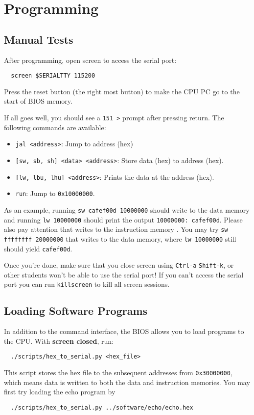 \section{Programming} \label{sec:programming}
\subsection{Manual Tests}
After programming, open screen to access the serial port:
\begin{verbatim}
  screen $SERIALTTY 115200
\end{verbatim}
Press the reset button (the right most button) to make the CPU PC go to the start of BIOS memory.

If all goes well, you should see a \verb|151 >| prompt after pressing return.
The following commands are available:
\begin{itemize}
\item \verb|jal <address>|: Jump to address (hex)
\item \verb|[sw, sb, sh] <data> <address>|: Store data (hex) to address (hex).
\item \verb|[lw, lbu, lhu] <address>|: Prints the data at the address (hex).
\item \verb|run|: Jump to \verb|0x10000000|.
\end{itemize}

As an example, running \verb|sw cafef00d 10000000| should write to the data memory
and running \verb|lw 10000000| should print the output \verb|10000000: cafef00d|.
Please also pay attention that writes to the instruction memory .
You may try \verb|sw ffffffff 20000000| that writes to the data memory,
where \verb|lw 10000000| still should yield \verb|cafef00d|.

Once you're done, make sure that you close screen using \verb|Ctrl-a| \verb|Shift-k|,
or other students won't be able to use the serial port!
If you can't access the serial port you can run \verb|killscreen| to kill all screen sessions.

\subsection{Loading Software Programs}
In addition to the command interface,
the BIOS allows you to load programs to the CPU.
With {\bf screen closed}, run:
\begin{verbatim}
  ./scripts/hex_to_serial.py <hex_file>
\end{verbatim}
This script stores the hex file to the subsequent addresses from \verb|0x30000000|,
which means data is written to both the data and instruction memories.
You may first try loading the echo program by
\begin{verbatim}
  ./scripts/hex_to_serial.py ../software/echo/echo.hex
\end{verbatim}

